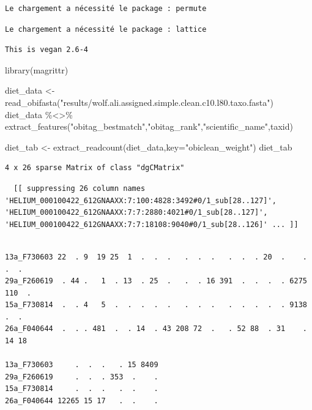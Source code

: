 \documentclass[
  letterpaper,
  DIV=11,
  numbers=noendperiod]{scrreprt}
\newenvironment{Shaded}{\begin{snugshade}}{\end{snugshade}}
\newcommand{\AttributeTok}[1]{\textcolor[rgb]{0.40,0.45,0.13}{#1}}
\newcommand{\FunctionTok}[1]{\textcolor[rgb]{0.28,0.35,0.67}{#1}}
\newcommand{\NormalTok}[1]{\textcolor[rgb]{0.00,0.23,0.31}{#1}}
\newcommand{\OtherTok}[1]{\textcolor[rgb]{0.00,0.23,0.31}{#1}}
\newcommand{\SpecialCharTok}[1]{\textcolor[rgb]{0.37,0.37,0.37}{#1}}
\newcommand{\StringTok}[1]{\textcolor[rgb]{0.13,0.47,0.30}{#1}}
\begin{document}
\begin{verbatim}
Le chargement a nécessité le package : permute
\end{verbatim}

\begin{verbatim}
Le chargement a nécessité le package : lattice
\end{verbatim}

\begin{verbatim}
This is vegan 2.6-4
\end{verbatim}

\begin{Shaded}
\begin{Highlighting}[]
\FunctionTok{library}\NormalTok{(magrittr)}
 

\NormalTok{diet\_data }\OtherTok{\textless{}{-}} \FunctionTok{read\_obifasta}\NormalTok{(}\StringTok{"results/wolf.ali.assigned.simple.clean.c10.l80.taxo.fasta"}\NormalTok{) }
\NormalTok{diet\_data }\SpecialCharTok{\%\textless{}\textgreater{}\%} \FunctionTok{extract\_features}\NormalTok{(}\StringTok{"obitag\_bestmatch"}\NormalTok{,}\StringTok{"obitag\_rank"}\NormalTok{,}\StringTok{"scientific\_name"}\NormalTok{,}\StringTok{\textquotesingle{}taxid\textquotesingle{}}\NormalTok{)}

\NormalTok{diet\_tab }\OtherTok{\textless{}{-}} \FunctionTok{extract\_readcount}\NormalTok{(diet\_data,}\AttributeTok{key=}\StringTok{"obiclean\_weight"}\NormalTok{)}
\NormalTok{diet\_tab}
\end{Highlighting}
\end{Shaded}

\begin{verbatim}
4 x 26 sparse Matrix of class "dgCMatrix"
\end{verbatim}

\begin{verbatim}
  [[ suppressing 26 column names 'HELIUM_000100422_612GNAAXX:7:100:4828:3492#0/1_sub[28..127]', 'HELIUM_000100422_612GNAAXX:7:7:2880:4021#0/1_sub[28..127]', 'HELIUM_000100422_612GNAAXX:7:7:18108:9040#0/1_sub[28..126]' ... ]]
\end{verbatim}

\begin{verbatim}
                                                                            
13a_F730603 22  . 9  19 25  1  .  .  .   .  .  .   .  .  . 20  .    .   .  .
29a_F260619  . 44 .   1  . 13  . 25  .   .  . 16 391  .  .  .  . 6275 110  .
15a_F730814  .  . 4   5  .  .  .  .  .   .  .  .   .  .  .  .  . 9138   .  .
26a_F040644  .  . . 481  .  . 14  . 43 208 72  .   . 52 88  . 31    .  14 18
                                   
13a_F730603     .  .  .   . 15 8409
29a_F260619     .  .  . 353  .    .
15a_F730814     .  .  .   .  .    .
26a_F040644 12265 15 17   .  .    .
\end{verbatim}
\end{document}
